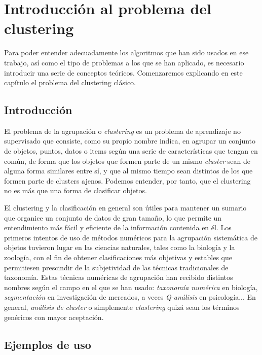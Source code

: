 \chapter{Introducción al problema del clustering}\label{ch:clustering}

Para poder entender adecuadamente los algoritmos que han sido usados en ese trabajo, así como el tipo de problemas a los que se han aplicado, es necesario introducir una serie de conceptos teóricos. Comenzaremos explicando en este capítulo el problema del clustering clásico. 

\section{Introducción}

El problema de la agrupación o \emph{clustering} es un problema de aprendizaje no supervisado que consiste, como su propio nombre indica, en agrupar un conjunto de objetos, puntos, datos o items según una serie de características que tengan en común, de forma que los objetos que formen parte de un mismo \emph{cluster} sean de alguna forma similares entre sí, y que al mismo tiempo sean distintos de los que formen parte de clusters ajenos. Podemos entender, por tanto, que el clustering no es más que una forma de clasificar objetos.

El clustering y la clasificación en general son útiles para mantener un sumario que organice un conjunto de datos de gran tamaño, lo que permite un entendimiento más fácil y eficiente de la información contenida en él. Los primeros intentos de uso de métodos numéricos para la agrupación sistemática de objetos tuvieron lugar en las ciencias naturales, tales como la biología y la zoología, con el fin de obtener clasificaciones más objetivas y estables que permitiesen prescindir de la subjetividad de las técnicas tradicionales de taxonomía. Estas técnicas numéricas de agrupación han recibido distintos nombres según el campo en el que se han usado: \emph{taxonomía numérica} en biología, \emph{segmentación} en investigación de mercados, a veces \emph{Q-análisis} en psicología... En general, \emph{análisis de cluster} o simplemente \emph{clustering} quizá sean los términos genéricos con mayor aceptación. \cite{everitt2011cluster}

\section{Ejemplos de uso}

